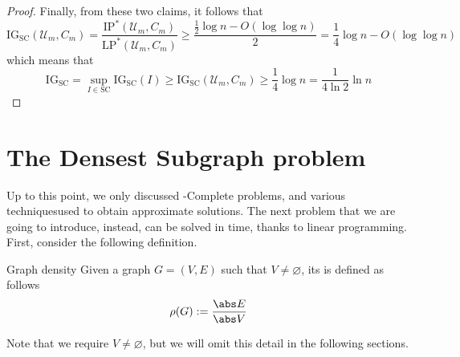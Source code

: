 \documentclass[a4paper, 12pt]{report}
\begin{document}
\begin{proof}

        Finally, from these two claims, it follows that $$\mathrm{IG_{SC}}(\mathcal U_m, C_m) = \dfrac{\mathrm{IP^*}(\mathcal U_m, C_m)}{\mathrm{LP^*}(\mathcal U_m, C_m)} \ge \dfrac{\tfrac{1}{2} \log n - O(\log \log n)}{2} = \dfrac{1}{4} \log n - O(\log \log n)$$ which means that $$\mathrm{IG_{SC}} = \sup_{I \in \mathrm{SC}}{\mathrm{IG_{SC}}(I)} \ge \mathrm{IG_{SC}}(\mathcal U_m, C_m) \ge \dfrac{1}{4} \log n = \dfrac{1}{4 \ln 2} \ln n$$
    \end{proof}

    \section{The Densest Subgraph problem}
    
    Up to this point, we only discussed \NPclass-Complete problems, and various techniquesused to obtain approximate solutions. The next problem that we are going to introduce, instead, can be solved in  time, thanks to linear programming. First, consider the following definition.

    \begin{frameddefn}{Graph density}
        Given a graph $G = (V, E)$ such that $V \neq \varnothing$, its  is defined as follows $$\rho(G) := \dfrac{\abs E}{\abs V}$$
    \end{frameddefn}

    Note that we require $V \neq \varnothing$, but we will omit this detail in the following sections.
\end{document}
